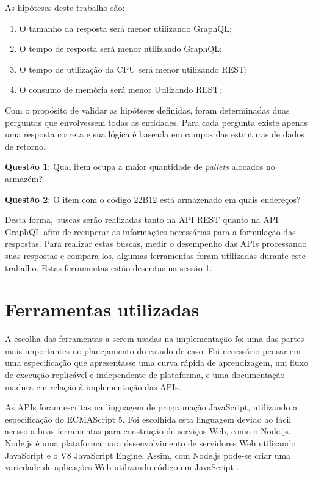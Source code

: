 As hipóteses deste trabalho são: 

\begin{enumerate}[label=\alph*)]
\item O tamanho da resposta será menor utilizando GraphQL;
\item O tempo de resposta será menor utilizando GraphQL;
\item O tempo de utilização da CPU será menor utilizando REST;
\item O consumo de memória será menor Utilizando REST;
\end{enumerate}

Com o propósito de validar as hipóteses definidas, foram determinadas duas perguntas que envolvessem todas as entidades. Para cada pergunta existe apenas uma resposta correta e sua lógica é baseada em campos das estruturas de dados de retorno.

\textbf{Questão 1}: Qual item ocupa a maior quantidade de \textit{pallets} alocados no armazém?

\textbf{Questão 2}: O item com o código 22B12 está armazenado em quais endereços?

Desta forma, buscas serão realizadas tanto na API REST quanto na API GraphQL afim de recuperar as informações necessárias para a formulação das respostas. Para realizar estas buscas, medir o desempenho das APIs processando suas respostas e compara-los, algumas ferramentas foram utilizadas durante este trabalho. Estas ferramentas estão descritas na sessão \ref{sec:ferramentas}.

\section{Ferramentas utilizadas} \label{sec:ferramentas}

A escolha das ferramentas a serem usadas na implementação foi uma das partes mais importantes no planejamento do estudo de caso. Foi necessário pensar em uma especificação que apresentasse uma curva rápida de aprendizagem, um fluxo de execução replicável e independente de plataforma, e uma documentação madura em relação à implementação das APIs.

As APIs foram escritas na linguagem de programação JavaScript, utilizando a especificação do ECMAScript 5. Foi escolhida esta linguagem devido ao fácil acesso a boas ferramentas para construção de serviços Web, como o Node.js. Node.js é uma plataforma para desenvolvimento de servidores Web utilizando JavaScript e o V8 JavaScript Engine. Assim, com Node.js pode-se criar uma variedade de aplicações Web utilizando código em JavaScript \cite{node-definition}.

